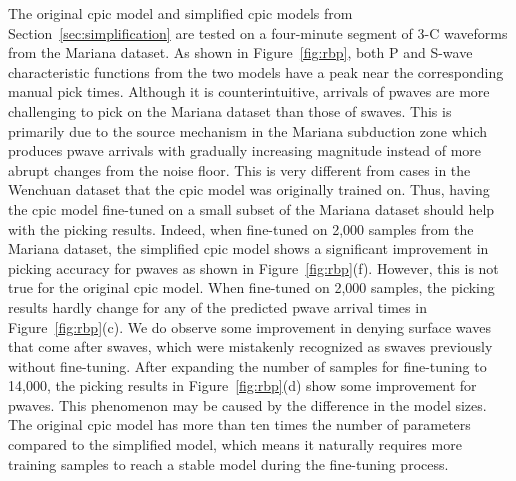 \documentclass{article}
\begin{document}
The original \gls{cpic} model and simplified \gls{cpic} models from Section~\ref{sec:simplification} are tested on a four-minute segment of 3-C waveforms from the Mariana dataset.
As shown in Figure~\ref{fig:rbp}, both P and S-wave characteristic functions from the two  models have a peak near the corresponding manual pick times.
Although it is counterintuitive, arrivals of \glspl{pwave} are more challenging to pick on the Mariana dataset than those of \glspl{swave}.
This is primarily due to the source mechanism in the Mariana subduction zone which produces \gls{pwave} arrivals with gradually increasing magnitude instead of more abrupt changes from the noise floor. 
This is very different from cases in the Wenchuan dataset that the \gls{cpic} model was originally trained on.
Thus, having the \gls{cpic} model fine-tuned on a small subset of the Mariana dataset should help with the picking results.
Indeed, when fine-tuned on 2,000 samples from the Mariana dataset, the simplified \gls{cpic} model shows a significant improvement in picking accuracy for \glspl{pwave} as shown in Figure~\ref{fig:rbp}(f).
However, this is not true for the original \gls{cpic} model.
When fine-tuned on 2,000 samples, the picking results hardly change for any of the predicted \gls{pwave} arrival times in Figure~\ref{fig:rbp}(c).
We do observe some improvement in denying surface waves that come after \glspl{swave}, which were mistakenly recognized as \glspl{swave} previously without fine-tuning.
After expanding the number of samples for fine-tuning to 14,000, the picking results in Figure~\ref{fig:rbp}(d) show some improvement for \glspl{pwave}.
This phenomenon may be caused by the difference in the model sizes.
The original \gls{cpic} model has more than ten times the number of parameters compared to the simplified model, which means it naturally requires more training samples to reach a stable model during the fine-tuning process. 
%
\end{document}
